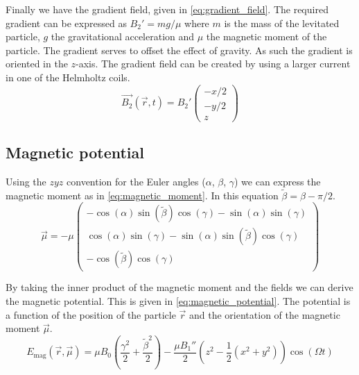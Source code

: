 Finally we have the gradient field, given in \autoref{eq:gradient_field}. The required gradient can be expressed as $B_2' = mg/\mu$ where $m$ is the mass of the levitated particle, $g$ the gravitational acceleration and $\mu$ the magnetic moment of the particle. The gradient serves to offset the effect of gravity. As such the gradient is oriented in the $z$-axis. The gradient field can be created by using a larger current in one of the Helmholtz coils.
\begin{equation}
    \vec{B_2}(\vec{r}, t) = B_2' \begin{pmatrix}
        -x / 2 \\
        -y / 2 \\
        z
    \end{pmatrix}
    \label{eq:gradient_field}
\end{equation}

\subsection{Magnetic potential}
\label{subsec:magnetic_moment}
Using the $zyz$ convention for the Euler angles ($\alpha$, $\beta$, $\gamma$) we can express the magnetic moment as in \autoref{eq:magnetic_moment}. In this equation $\tilde\beta = \beta - \pi/2$.
\begin{equation}
    \vec{\mu} = -\mu \begin{pmatrix}
        -\cos(\alpha)\sin(\tilde\beta)\cos(\gamma) - \sin(\alpha)\sin(\gamma) \\
        \cos(\alpha)\sin(\gamma) - \sin(\alpha)\sin(\tilde\beta)\cos(\gamma) \\
        -\cos(\tilde\beta)\cos(\gamma)
    \end{pmatrix}
    \label{eq:magnetic_moment}
\end{equation}

By taking the inner product of the magnetic moment and the fields we can derive the magnetic potential. This is given in \autoref{eq:magnetic_potential}. The potential is a function of the position of the particle $\vec{r}$ and the orientation of the magnetic moment $\vec{\mu}$.
\begin{equation}
    E_\text{mag}(\vec{r}, \vec{\mu}) = \mu B_0 \left(\frac{\gamma^2}{2} + \frac{\tilde\beta^2}{2}\right) - \frac{\mu B_1''}{2} \left(z^2 - \frac{1}{2}\left(x^2 + y^2\right)\right)\cos(\Omega t)
    \label{eq:magnetic_potential}
\end{equation}

